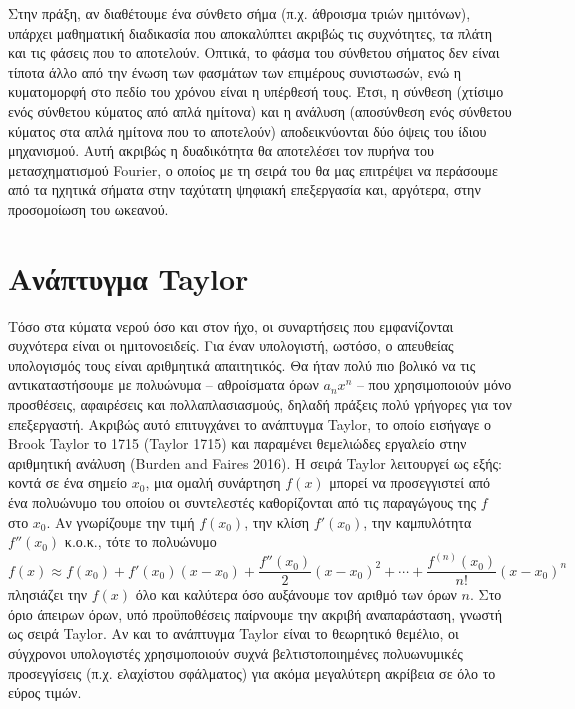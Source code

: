 Στην πράξη, αν διαθέτουμε ένα σύνθετο σήμα (π.χ. άθροισμα τριών
ημιτόνων), υπάρχει μαθηματική διαδικασία που αποκαλύπτει ακριβώς τις
συχνότητες, τα πλάτη και τις φάσεις που το αποτελούν. Οπτικά, το φάσμα
του σύνθετου σήματος δεν είναι τίποτα άλλο από την ένωση των φασμάτων
των επιμέρους συνιστωσών, ενώ η κυματομορφή στο πεδίο του χρόνου είναι η
υπέρθεσή τους. Έτσι, η σύνθεση (χτίσιμο ενός σύνθετου κύματος από απλά
ημίτονα) και η ανάλυση (αποσύνθεση ενός σύνθετου κύματος στα απλά
ημίτονα που το αποτελούν) αποδεικνύονται δύο όψεις του ίδιου μηχανισμού.
Αυτή ακριβώς η δυαδικότητα θα αποτελέσει τον πυρήνα του μετασχηματισμού
Fourier, ο οποίος με τη σειρά του θα μας επιτρέψει να περάσουμε από τα
ηχητικά σήματα στην ταχύτατη ψηφιακή επεξεργασία και, αργότερα, στην
προσομοίωση του ωκεανού.

\section{Ανάπτυγμα
Taylor}\label{ux3b1ux3bdux3acux3c0ux3c4ux3c5ux3b3ux3bcux3b1-taylor}

Τόσο στα κύματα νερού όσο και στον ήχο, οι συναρτήσεις που εμφανίζονται
συχνότερα είναι οι ημιτονοειδείς. Για έναν υπολογιστή, ωστόσο, ο
απευθείας υπολογισμός τους είναι αριθμητικά απαιτητικός. Θα ήταν πολύ
πιο βολικό να τις αντικαταστήσουμε με πολυώνυμα -- αθροίσματα όρων
\(a_n x^n\) -- που χρησιμοποιούν μόνο προσθέσεις, αφαιρέσεις και
πολλαπλασιασμούς, δηλαδή πράξεις πολύ γρήγορες για τον επεξεργαστή.
Ακριβώς αυτό επιτυγχάνει το ανάπτυγμα Taylor, το οποίο εισήγαγε ο Brook
Taylor το 1715 (Taylor 1715) και παραμένει θεμελιώδες εργαλείο στην
αριθμητική ανάλυση (Burden and Faires 2016). Η σειρά Taylor λειτουργεί
ως εξής: κοντά σε ένα σημείο \(x_0\), μια ομαλή συνάρτηση \(f(x)\)
μπορεί να προσεγγιστεί από ένα πολυώνυμο του οποίου οι συντελεστές
καθορίζονται από τις παραγώγους της \(f\) στο \(x_0\). Αν γνωρίζουμε την
τιμή \(f(x_0)\), την κλίση \(f'(x_0)\), την καμπυλότητα \(f''(x_0)\)
κ.ο.κ., τότε το πολυώνυμο
\[ f(x) \approx f(x_0) + f'(x_0)(x-x_0) + \frac{f''(x_0)}{2}(x-x_0)^2 + \cdots + \frac{f^{(n)}(x_0)}{n!}(x-x_0)^n \]
πλησιάζει την \(f(x)\) όλο και καλύτερα όσο αυξάνουμε τον αριθμό των
όρων \(n\). Στο όριο άπειρων όρων, υπό προϋποθέσεις παίρνουμε την ακριβή
αναπαράσταση, γνωστή ως σειρά Taylor. Αν και το ανάπτυγμα Taylor είναι
το θεωρητικό θεμέλιο, οι σύγχρονοι υπολογιστές χρησιμοποιούν συχνά
βελτιστοποιημένες πολυωνυμικές προσεγγίσεις (π.χ. ελαχίστου σφάλματος)
για ακόμα μεγαλύτερη ακρίβεια σε όλο το εύρος τιμών.


